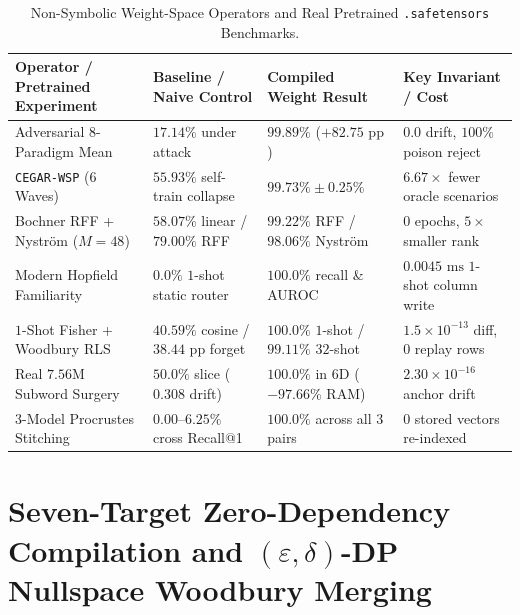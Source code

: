 \documentclass[11pt,a4paper]{article}
\begin{document}
\begin{table}[htbp]
\centering
\caption{Non-Symbolic Weight-Space Operators and Real Pretrained \texttt{.safetensors} Benchmarks.}
\label{tab:nonsymbolic_and_real}
\small
\begin{tabular}{@{}llll@{}}
\toprule
\textbf{Operator / Pretrained Experiment} & \textbf{Baseline / Naive Control} & \textbf{Compiled Weight Result} & \textbf{Key Invariant / Cost} \\
\midrule
Adversarial $8$-Paradigm Mean & $17.14\%$ under attack & $99.89\%$ ($+82.75\text{ pp}$) & $0.0$ drift, $100\%$ poison reject \\
\texttt{CEGAR-WSP} ($6$ Waves) & $55.93\%$ self-train collapse & $99.73\% \pm 0.25\%$ & $6.67\times$ fewer oracle scenarios \\
Bochner RFF + Nystr\"om ($M=48$) & $58.07\%$ linear / $79.00\%$ RFF & $99.22\%$ RFF / $98.06\%$ Nystr\"om & $0$ epochs, $5\times$ smaller rank \\
Modern Hopfield Familiarity & $0.0\%$ $1$-shot static router & $100.0\%$ recall \& AUROC & $0.0045\text{ ms}$ $1$-shot column write \\
$1$-Shot Fisher + Woodbury RLS & $40.59\%$ cosine / $38.44\text{ pp}$ forget & $100.0\%$ $1$-shot / $99.11\%$ $32$-shot & $1.5\times 10^{-13}$ diff, $0$ replay rows \\
Real $7.56\text{M}$ Subword Surgery & $50.0\%$ slice ($0.308$ drift) & $100.0\%$ in $6\text{D}$ ($-97.66\%$ RAM) & $2.30 \times 10^{-16}$ anchor drift \\
$3$-Model Procrustes Stitching & $0.00\text{--}6.25\%$ cross Recall@1 & $100.0\%$ across all $3$ pairs & $0$ stored vectors re-indexed \\
\bottomrule
\end{tabular}
\end{table}

\section{Seven-Target Zero-Dependency Compilation and $(\varepsilon, \delta)$-DP Nullspace Woodbury Merging}
\end{document}
